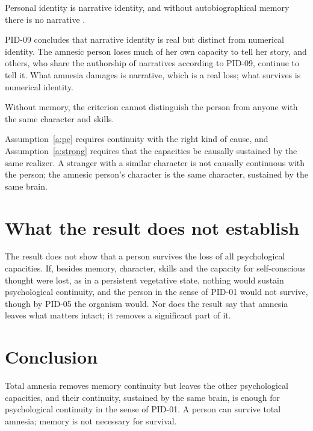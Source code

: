 \documentclass{situationist-preprint}
\begin{document}
\begin{objection}[No narrative]
Personal identity is narrative identity, and without autobiographical memory there is no narrative \citep{Schechtman1996}.
\end{objection}

\begin{reply}
PID-09 concludes that narrative identity is real but distinct from numerical identity. The amnesic person loses much of her own capacity to tell her story, and others, who share the authorship of narratives according to PID-09, continue to tell it. What amnesia damages is narrative, which is a real loss; what survives is numerical identity.
\end{reply}

\begin{objection}[Duplicates]
Without memory, the criterion cannot distinguish the person from anyone with the same character and skills.
\end{objection}

\begin{reply}
Assumption~\ref{a:pc} requires continuity with the right kind of cause, and Assumption~\ref{a:strong} requires that the capacities be causally sustained by the same realizer. A stranger with a similar character is not causally continuous with the person; the amnesic person's character is the same character, sustained by the same brain.
\end{reply}

\section{What the result does not establish}\label{s:not}

The result does not show that a person survives the loss of all psychological capacities. If, besides memory, character, skills and the capacity for self-conscious thought were lost, as in a persistent vegetative state, nothing would sustain psychological continuity, and the person in the sense of PID-01 would not survive, though by PID-05 the organism would. Nor does the result say that amnesia leaves what matters intact; it removes a significant part of it.

\section{Conclusion}

Total amnesia removes memory continuity but leaves the other psychological capacities, and their continuity, sustained by the same brain, is enough for psychological continuity in the sense of PID-01. A person can survive total amnesia; memory is not necessary for survival.
\end{document}
